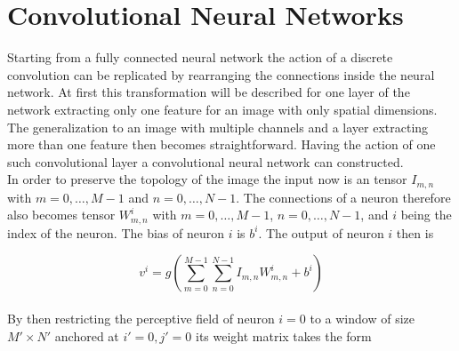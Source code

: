 \section{Convolutional Neural Networks}

Starting from a fully connected neural network the action of a discrete convolution can be replicated by rearranging the connections inside the neural network. At first this transformation will be described for one layer of the network extracting only one feature for an image with only spatial dimensions. The generalization to an image with multiple channels and a layer extracting more than one feature then becomes straightforward. Having the action of one such convolutional layer a convolutional neural network can constructed. \\

In order to preserve the topology of the image the input now is an tensor $I_{m,n}$ with $m=0,\dots ,M-1$ and $n=0,\dots ,N-1$. The connections of a neuron therefore also becomes tensor $W_{m,n}^i$ with $m=0,\dots ,M-1$, $n=0,\dots ,N-1$, and $i$ being the index of the neuron. The bias of neuron $i$ is $b^i$. The output of neuron $i$ then is

\begin{equation}
v^i = g\left( \sum_{m=0}^{M-1} \sum_{n=0}^{N-1} I_{m,n} W_{m,n}^i + b^i \right)
\end{equation} \\
By then restricting the perceptive field of neuron $i=0$ to a window of size $M'\times N'$ anchored at $i'=0,j'=0$ its weight matrix takes the form

